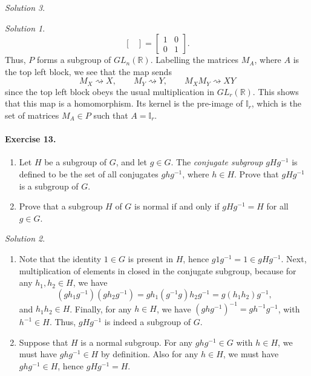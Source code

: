 \documentclass[11pt]{report}
\def\R{\mathbb{R}}
\theoremstyle{remark}
\newtheorem*{solution}{Solution}
\begin{document}
\begin{solution}
\begin{solution}
\[\begin{bmatrix}
            \end{bmatrix} = \begin{bmatrix}
                1 & 0 \\ 0 & 1
            \end{bmatrix}.
        \] Thus, $P$ forms a subgroup of $GL_n(\R)$. Labelling the matrices $M_A$,
        where $A$ is the top left block, we see that the map sends \[
            M_X \rightsquigarrow X, \qquad M_Y \rightsquigarrow Y, \qquad 
            M_XM_Y \rightsquigarrow XY
        \] since the top left block obeys the usual multiplication in $GL_r(\R)$.
        This shows that this map is a homomorphism. Its kernel is the pre-image of
        $\mathbb{I}_r$, which is the set of matrices $M_A \in P$ such that $A =
        \mathbb{I}_r$.
    \end{solution}

    \paragraph{Exercise 13.} \mbox{}
    \begin{enumerate}
        \itemsep0em
        \item Let $H$ be a subgroup of $G$, and let $g \in G$. The \textit{conjugate
        subgroup} $gHg^{-1}$ is defined to be the set of all conjugates $ghg^{-1}$,
        where $h \in H$. Prove that $gHg^{-1}$ is a subgroup of $G$.
        \item Prove that a subgroup $H$ of $G$ is normal if and only if $gHg^{-1} =
        H$ for all $g \in G$.
    \end{enumerate}
    \begin{solution} \mbox{}
    \begin{enumerate}
        \item Note that the identity $1 \in G$ is present in $H$, hence $g 1 g^{-1}
        = 1 \in gHg^{-1}$. Next, multiplication of elements in closed in the
        conjugate subgroup, because for any $h_1, h_2 \in H$, we have \[
            (gh_1g^{-1})(gh_2g^{-1}) = gh_1(g^{-1}g)h_2g^{-1} = g(h_1h_2)g^{-1},
        \] and $h_1 h_2 \in H$. Finally, for any $h \in H$, we have $(ghg^{-1})^{-1}
        = gh^{-1}g^{-1}$, with $h^{-1} \in H$. Thus, $gHg^{-1}$ is indeed a subgroup
        of $G$.

        \item Suppose that $H$ is a normal subgroup. For any $ghg^{-1} \in G$ with
        $h \in H$, we must have $ghg^{-1} \in H$ by definition. Also for any $h \in
        H$, we must have $ghg^{-1} \in H$, hence $gHg^{-1} = H$.


\end{enumerate}
\end{solution}
\end{solution}
\end{document}
